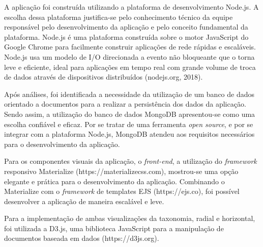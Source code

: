 A aplicação foi construída utilizando a plataforma de desenvolvimento Node.js. A escolha dessa plataforma justifica-se pelo conhecimento técnico da equipe
responsável pelo desenvolvimento da aplicação e pelo conceito fundamental da plataforma. Node.js é uma plataforma construída sobre o motor JavaScript do 
Google Chrome para facilmente construir aplicações de rede rápidas e escaláveis. Node.js usa um modelo de I/O direcionada a evento não bloqueante que o torna leve e eficiente,
ideal para aplicações em tempo real com grande volume de troca de dados através de dispositivos distribuídos (nodejs.org, 2018).

\par
Após análises, foi identificada a necessidade da utilização de um banco de dados orientado a documentos para a realizar a persistência dos dados da aplicação. 
Sendo assim, a utilização do banco de dados MongoDB apresentou-se como uma escolha confiável e eficaz. 
Por se tratar de uma ferramenta \textit{open source}, e por se integrar com a plataforma Node.js, MongoDB atendeu aos requisitos necessários para o desenvolvimento da aplicação.

\par
Para os componentes visuais da aplicação, o \textit{front-end}, a utilização do \textit{framework} responsivo Materialize (https://materializecss.com), 
mostrou-se uma opção elegante e prática para o desenvolvimento da aplicação. Combinando o Materialize com o \textit{framework} de templates EJS (https://ejs.co), 
foi possível desenvolver a aplicação de maneira escalável e leve.

\par
Para a implementação de ambas visualizações da taxonomia, radial e horizontal, foi utilizada a D3.js, uma biblioteca JavaScript para a manipulação de documentos 
baseada em dados (https://d3js.org).
